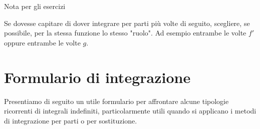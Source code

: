 \documentclass[12pt]{report}
\begin{document}
	\begin{osservazione}{Nota per gli esercizi}{}
		
		Se dovesse capitare di dover integrare per parti più volte di seguito, scegliere, se possibile, per la stessa funzione lo stesso "ruolo". Ad esempio entrambe le volte $f'$ oppure entrambe le volte $g$.
		
	\end{osservazione}
	
	\section{Formulario di integrazione}
	
	Presentiamo di seguito un utile formulario per affrontare alcune tipologie ricorrenti di integrali indefiniti, particolarmente utili quando si applicano i metodi di integrazione per parti o per sostituzione.
	
\end{document}
